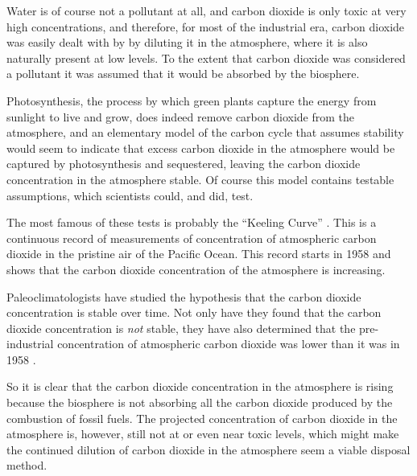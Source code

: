 Water is of course not a pollutant at all, and carbon dioxide is only toxic at
very high concentrations, and therefore, for most of the industrial era, carbon
dioxide was easily dealt with by by diluting it in the atmosphere, where it is
also naturally present at low levels. To the extent that carbon dioxide was
considered a pollutant it was assumed that it would be absorbed by the
biosphere.

Photosynthesis, the process by which green plants capture the energy from
sunlight to live and grow, does indeed remove carbon dioxide from the
atmosphere, and an elementary model of the carbon cycle that assumes stability
would seem to indicate that excess carbon dioxide in the atmosphere would be
captured by photosynthesis and sequestered, leaving the carbon dioxide
concentration in the atmosphere stable. Of course this model contains
testable assumptions, which scientists could, and did, test.

The most famous of these tests is probably the ``Keeling Curve''
\autocite{Harris2010}. This is a continuous record of measurements of
concentration of atmospheric carbon dioxide in the pristine air of the Pacific
Ocean. This record starts in 1958 and shows that the carbon dioxide
concentration of the atmosphere is increasing.

Paleoclimatologists have studied the hypothesis that the carbon dioxide
concentration is stable over time. Not only have they found that the carbon
dioxide concentration is \emph{not} stable, they have also determined that the
pre-industrial concentration of atmospheric carbon dioxide was lower than it was
in 1958 \autocite{Petit1999}.

So it is clear that the carbon dioxide concentration in the atmosphere is rising
because the biosphere is not absorbing all the carbon dioxide produced by the
combustion of fossil fuels. The projected concentration of carbon dioxide in the
atmosphere is, however, still not at or even near toxic levels, which might make
the continued dilution of carbon dioxide in the atmosphere seem a viable
disposal method.

